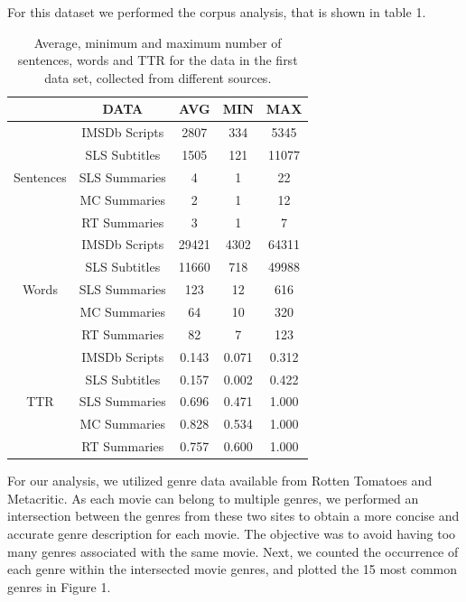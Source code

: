 \documentclass[fleqn,moreauthors,10pt]{ds_report}
\begin{document}
For this dataset we performed the corpus analysis, that is shown in table 1. 

\begin{table}[h]
\caption{Average, minimum and maximum number of sentences, words and TTR for the data in the first data set, collected from different sources.}
\begin{center}
\begin{tabular}{c|c|ccc}
  & DATA & AVG & MIN &  MAX\\
 \hline
  & IMSDb Scripts &  2807&  334  & 5345\\ 
  & SLS Subtitles &  1505& 121 & 11077 \\
Sentences & SLS Summaries&  4 & 1 & 22 \\
& MC Summaries &  2 & 1 & 12\\
& RT Summaries &  3 & 1 & 7 \\
 \hline
  & IMSDb Scripts &  29421& 4302  & 64311\\ 
  & SLS Subtitles &  11660& 718 & 49988 \\
Words & SLS Summaries&  123 & 12 & 616 \\
& MC Summaries &  64 & 10 & 320\\
& RT Summaries &  82 & 7 & 123 \\
\hline
  & IMSDb Scripts &  0.143&  0.071  & 0.312\\ 
  & SLS Subtitles &  0.157& 0.002 & 0.422 \\
TTR & SLS Summaries&  0.696 & 0.471 & 1.000 \\
& MC Summaries &  0.828 & 0.534 & 1.000\\
& RT Summaries &  0.757 & 0.600 & 1.000 \\
\end{tabular}
\label{tab1}
\end{center}
\end{table}

For our analysis, we utilized genre data available from Rotten Tomatoes and Metacritic. As each movie can belong to multiple genres, we performed an intersection between the genres from these two sites to obtain a more concise and accurate genre description for each movie. The objective was to avoid having too many genres associated with the same movie. Next, we counted the occurrence of each genre within the intersected movie genres, and plotted the 15 most common genres in Figure 1.
\end{document}
